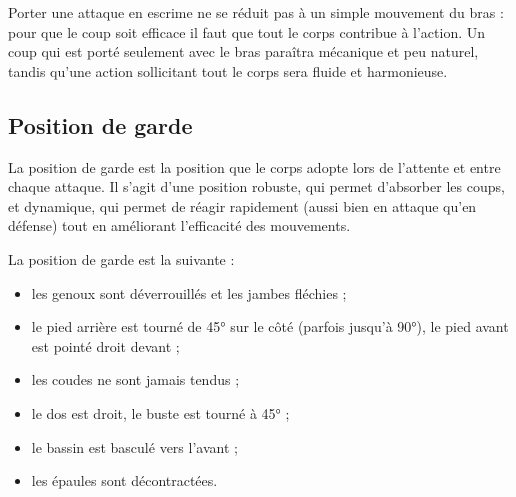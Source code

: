 Porter une attaque en escrime ne se réduit pas à un simple mouvement du bras : pour que le coup soit efficace il faut que tout le corps contribue à l'action.
Un coup qui est porté seulement avec le bras paraîtra mécanique et peu naturel, tandis qu'une action sollicitant tout le corps sera fluide et harmonieuse.


\subsection{Position de garde}


La position de garde est la position que le corps adopte lors de l'attente et entre chaque attaque.
Il s'agit d'une position robuste, qui permet d'absorber les coups, et dynamique, qui permet de réagir rapidement (aussi bien en attaque qu'en défense) tout en améliorant l'efficacité des mouvements.


\begin{definition}
\label{struc:def:position-garde}

La position de garde est la suivante :
\begin{itemize}
	\item les genoux sont déverrouillés et les jambes fléchies ;
	\item le pied arrière est tourné de 45° sur le côté (parfois jusqu'à 90°), le pied avant est pointé droit devant ;
	\item les coudes ne sont jamais tendus ;
	\item le dos est droit, le buste est tourné à 45° ;
	\item le bassin est basculé vers l'avant ;
	\item les épaules sont décontractées.
\end{itemize}
\end{definition}

